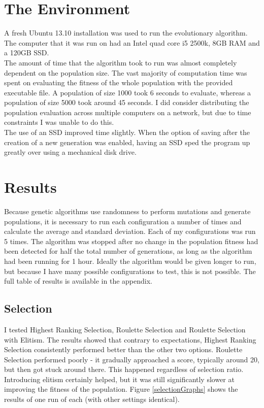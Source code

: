 \documentclass[]{report}
\begin{document}
\section{The Environment}
A fresh Ubuntu 13.10 installation was used to run the evolutionary algorithm. The computer that it was run on had an Intel quad core i5 2500k, 8GB RAM and a 120GB SSD. \\

The amount of time that the algorithm took to run was almost completely dependent on the population size. The vast majority of computation time was spent on evaluating the fitness of the whole population with the provided executable file. A population of size 1000 took 6 seconds to evaluate, whereas a population of size 5000 took around 45 seconds. I did consider distributing the population evaluation across multiple computers on a network, but due to time constraints I was unable to do this.\\

The use of an SSD improved time slightly. When the option of saving after the creation of a new generation was enabled, having an SSD sped the program up greatly over using a mechanical disk drive.

\section{Results} 
Because genetic algorithms use randomness to perform mutations and generate populations, it is necessary to run each configuration a number of times and calculate the average and standard deviation. Each of my configurations was run 5 times. The algorithm was stopped after no change in the population fitness had been detected for half the total number of generations, as long as the algorithm had been running for 1 hour. Ideally the algorithm would be given longer to run, but because I have many possible configurations to test, this is not possible. The full table of results is available in the appendix.\\

\subsection{Selection}

I tested Highest Ranking Selection, Roulette Selection and Roulette Selection with Elitism. The results showed that contrary to expectations, Highest Ranking Selection consistently performed better than the other two options. Roulette Selection performed poorly - it gradually approached a score, typically around 20, but then got stuck around there. This happened regardless of selection ratio. Introducing elitism certainly helped, but it was still significantly slower at improving the fitness of the population. Figure \ref{selectionGraphs} shows the results of one run of each (with other settings identical).
\end{document}
